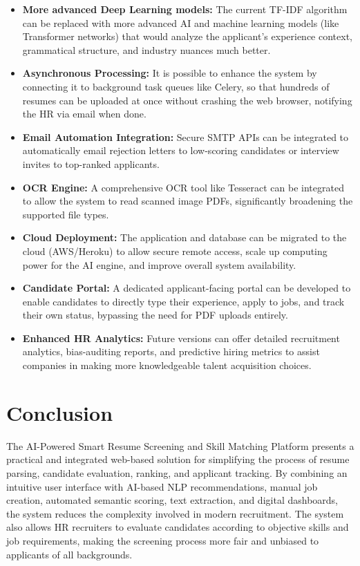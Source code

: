 \documentclass[12pt,a4paper]{report}
\begin{document}
\begin{itemize}
\item \textbf{More advanced Deep Learning models:} The current
TF-IDF algorithm can be replaced
with more advanced AI and machine learning models (like Transformer networks) that would analyze
the applicant's experience context, grammatical structure, and industry nuances much better.

\item \textbf{Asynchronous Processing:} It is possible to
enhance the system by connecting it to background task queues like Celery, so that hundreds of resumes can be uploaded at once without crashing the web browser, notifying the HR via email when done.

    \item \textbf{Email Automation Integration:} Secure SMTP APIs can be integrated to automatically email rejection letters to low-scoring candidates or interview invites to top-ranked applicants.

\item\textbf{OCR Engine:} A comprehensive OCR tool like Tesseract can be
integrated to allow the system to read scanned image PDFs, significantly broadening the supported file types.

\item \textbf{Cloud Deployment:} The application and database can be migrated to the cloud (AWS/Heroku) to
allow secure remote access, scale up computing power for the AI engine, and
improve overall system availability.

    \item \textbf{Candidate Portal:} A dedicated applicant-facing
portal can be developed to enable candidates to directly type their experience, apply to jobs, and track their own status, bypassing the need for PDF uploads entirely.

\item  \textbf{Enhanced HR Analytics:} Future versions can
offer detailed recruitment analytics, bias-auditing reports, and predictive hiring metrics to assist companies in making
more knowledgeable talent acquisition choices.
\end{itemize}

\section{Conclusion}

The AI-Powered Smart Resume Screening and Skill Matching Platform presents a practical and
integrated web-based solution for simplifying the process of resume parsing,
candidate evaluation, ranking, and applicant tracking. By combining an intuitive user
interface with AI-based NLP recommendations, manual job creation, automated
semantic scoring, text extraction, and digital dashboards, the system
reduces the complexity involved in modern recruitment. The
system also allows HR recruiters to evaluate candidates according to objective skills and
job requirements, making the screening process more fair and unbiased to applicants of all backgrounds.
\end{document}
